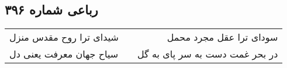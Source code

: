 \begin{center}
\section*{رباعی شماره ۳۹۶}
\label{sec:sh396}
\begin{longtable}{l p{0.5cm} r}
شیدای ترا روح مقدس منزل
&&
سودای ترا عقل مجرد محمل
\\
سیاح جهان معرفت یعنی دل
&&
در بحر غمت دست به سر پای به گل
\\
\end{longtable}
\end{center}
